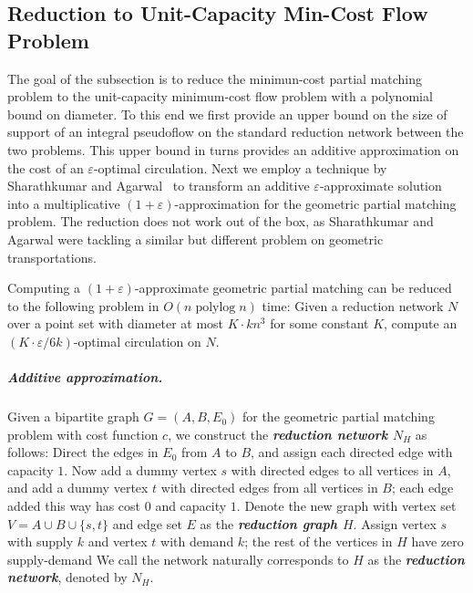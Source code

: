 \documentclass[a4paper,UKenglish]{socg-lipics-v2018}
\def\polylog{\mathop{\mathrm{polylog}}}
\def\eps{\varepsilon}
\def\set#1{\{ #1 \}}
\theoremstyle{plain}
\numberwithin{figure}{section}
\renewcommand{\paragraph}{\subparagraph}
\def\EMPH#1{\textbf{\emph{\boldmath #1}}}
\begin{document}


\subsection{Reduction to Unit-Capacity Min-Cost Flow Problem}
\label{SS:reduction}

The goal of the subsection is to reduce the minimun-cost partial matching problem to the unit-capacity minimum-cost flow problem with a polynomial bound on diameter.
To this end we first provide an upper bound on the size of support of an integral pseudoflow on the standard reduction network between the two problems.  This upper bound in turns provides an additive approximation on the cost of an $\eps$-optimal circulation.
Next we employ a technique by Sharathkumar and Agarwal~\cite{SA12} to transform an additive $\eps$-approximate solution into a multiplicative $(1+\eps)$-approximation for the geometric partial matching problem.  The reduction does not work out of the box, as Sharathkumar and Agarwal were tackling a similar but different problem on geometric transportations.

\begin{lemma}
\label{lemma:cost_scale_approx}
Computing a $(1+\eps)$-approximate geometric partial matching can be reduced to the following problem in $O(n \polylog n)$ time:
Given a reduction network $N$ over a point set with diameter at most $K \cdot kn^3$ for some constant $K$, compute an $(K \cdot \eps/6k)$-optimal circulation on $N$.
\end{lemma}


\paragraph{Additive approximation.}
Given a bipartite graph $G = (A,B,E_0)$ for the geometric partial matching problem with cost function $c$, we construct the \EMPH{reduction network $N_H$} as follows:
Direct the edges in $E_0$ from $A$ to $B$, and assign each directed edge with capacity $1$.  Now add a dummy vertex $s$ with directed edges to all vertices in $A$, and add a dummy vertex $t$ with directed edges from all vertices in $B$; each edge added this way has cost $0$ and capacity $1$.
Denote the new graph with vertex set $V = A \cup B \cup \set{s,t}$ and edge set $E$ as the \EMPH{reduction graph $H$}.
Assign vertex $s$ with supply $k$ and vertex $t$ with demand $k$; the rest of the vertices in $H$ have zero supply-demand
We call the network naturally corresponds to $H$ as the \EMPH{reduction network}, denoted by \EMPH{$N_H$}.
\end{document}
